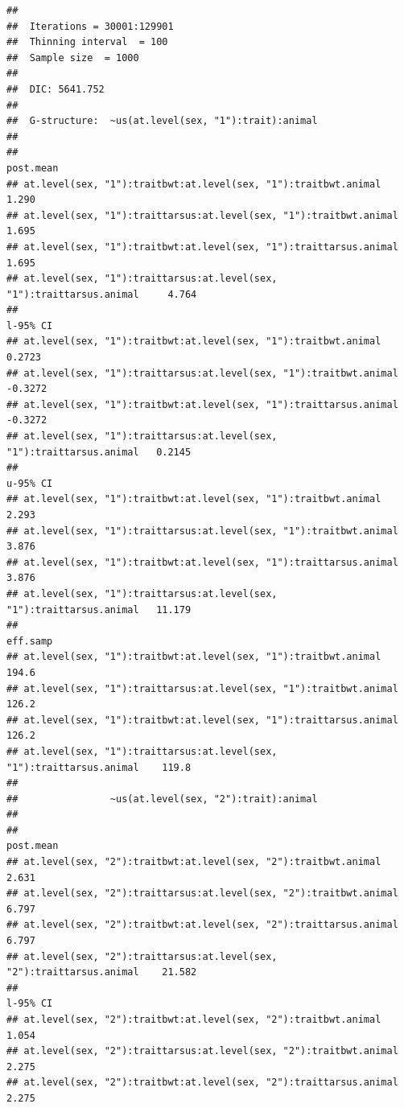 \documentclass[
  12pt,
]{book}
\begin{document}
\begin{verbatim}
## 
##  Iterations = 30001:129901
##  Thinning interval  = 100
##  Sample size  = 1000 
## 
##  DIC: 5641.752 
## 
##  G-structure:  ~us(at.level(sex, "1"):trait):animal
## 
##                                                                      post.mean
## at.level(sex, "1"):traitbwt:at.level(sex, "1"):traitbwt.animal           1.290
## at.level(sex, "1"):traittarsus:at.level(sex, "1"):traitbwt.animal        1.695
## at.level(sex, "1"):traitbwt:at.level(sex, "1"):traittarsus.animal        1.695
## at.level(sex, "1"):traittarsus:at.level(sex, "1"):traittarsus.animal     4.764
##                                                                      l-95% CI
## at.level(sex, "1"):traitbwt:at.level(sex, "1"):traitbwt.animal         0.2723
## at.level(sex, "1"):traittarsus:at.level(sex, "1"):traitbwt.animal     -0.3272
## at.level(sex, "1"):traitbwt:at.level(sex, "1"):traittarsus.animal     -0.3272
## at.level(sex, "1"):traittarsus:at.level(sex, "1"):traittarsus.animal   0.2145
##                                                                      u-95% CI
## at.level(sex, "1"):traitbwt:at.level(sex, "1"):traitbwt.animal          2.293
## at.level(sex, "1"):traittarsus:at.level(sex, "1"):traitbwt.animal       3.876
## at.level(sex, "1"):traitbwt:at.level(sex, "1"):traittarsus.animal       3.876
## at.level(sex, "1"):traittarsus:at.level(sex, "1"):traittarsus.animal   11.179
##                                                                      eff.samp
## at.level(sex, "1"):traitbwt:at.level(sex, "1"):traitbwt.animal          194.6
## at.level(sex, "1"):traittarsus:at.level(sex, "1"):traitbwt.animal       126.2
## at.level(sex, "1"):traitbwt:at.level(sex, "1"):traittarsus.animal       126.2
## at.level(sex, "1"):traittarsus:at.level(sex, "1"):traittarsus.animal    119.8
## 
##                ~us(at.level(sex, "2"):trait):animal
## 
##                                                                      post.mean
## at.level(sex, "2"):traitbwt:at.level(sex, "2"):traitbwt.animal           2.631
## at.level(sex, "2"):traittarsus:at.level(sex, "2"):traitbwt.animal        6.797
## at.level(sex, "2"):traitbwt:at.level(sex, "2"):traittarsus.animal        6.797
## at.level(sex, "2"):traittarsus:at.level(sex, "2"):traittarsus.animal    21.582
##                                                                      l-95% CI
## at.level(sex, "2"):traitbwt:at.level(sex, "2"):traitbwt.animal          1.054
## at.level(sex, "2"):traittarsus:at.level(sex, "2"):traitbwt.animal       2.275
## at.level(sex, "2"):traitbwt:at.level(sex, "2"):traittarsus.animal       2.275

\end{verbatim}
\end{document}
